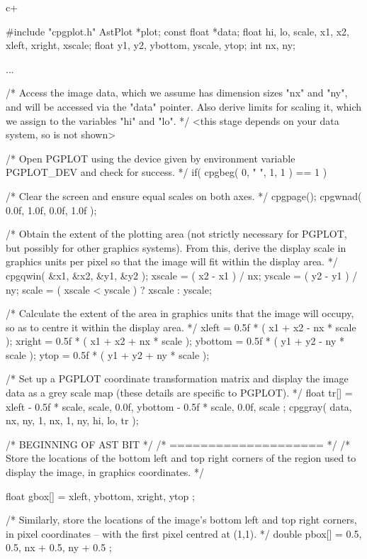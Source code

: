 \documentclass[twoside,11pt]{starlink}
\begin{document}
c+
\small
\begin{terminalv}
#include "cpgplot.h"
AstPlot *plot;
const float *data;
float hi, lo, scale, x1, x2, xleft, xright, xscale;
float y1, y2, ybottom, yscale, ytop;
int nx, ny;

...

/* Access the image data, which we assume has dimension sizes "nx" and
   "ny", and will be accessed via the "data" pointer.  Also derive
   limits for scaling it, which we assign to the variables "hi" and
   "lo". */
<this stage depends on your data system, so is not shown>

/* Open PGPLOT using the device given by environment variable
   PGPLOT_DEV and check for success. */
if( cpgbeg( 0, " ", 1, 1 ) == 1 ) {

/* Clear the screen and ensure equal scales on both axes. */
   cpgpage();
   cpgwnad( 0.0f, 1.0f, 0.0f, 1.0f );

/* Obtain the extent of the plotting area (not strictly necessary for
   PGPLOT, but possibly for other graphics systems). From this, derive
   the display scale in graphics units per pixel so that the image
   will fit within the display area. */
   cpgqwin( &x1, &x2, &y1, &y2 );
   xscale = ( x2 - x1 ) / nx;
   yscale = ( y2 - y1 ) / ny;
   scale = ( xscale < yscale ) ? xscale : yscale;

/* Calculate the extent of the area in graphics units that the image
   will occupy, so as to centre it within the display area. */
   xleft   = 0.5f * ( x1 + x2 - nx * scale );
   xright  = 0.5f * ( x1 + x2 + nx * scale );
   ybottom = 0.5f * ( y1 + y2 - ny * scale );
   ytop    = 0.5f * ( y1 + y2 + ny * scale );

/* Set up a PGPLOT coordinate transformation matrix and display the
   image data as a grey scale map (these details are specific to
   PGPLOT). */
   {
      float tr[] = { xleft - 0.5f * scale, scale, 0.0f,
                     ybottom - 0.5f * scale, 0.0f, scale };
      cpggray( data, nx, ny, 1, nx, 1, ny, hi, lo, tr );
   }

/* BEGINNING OF AST BIT */
/* ==================== */
/* Store the locations of the bottom left and top right corners of the
   region used to display the image, in graphics coordinates. */
   {
      float gbox[] = { xleft, ybottom, xright, ytop };

/* Similarly, store the locations of the image's bottom left and top
   right corners, in pixel coordinates -- with the first pixel centred
   at (1,1). */
      double pbox[] = { 0.5, 0.5, nx + 0.5, ny + 0.5 };

}}
\end{terminalv}
\end{document}
